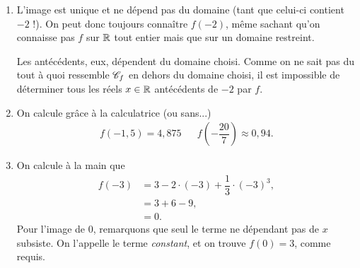 {\begin{enumerate}
			\item L'image est unique et ne dépend pas du domaine (tant que celui-ci contient $-2$ !).
			On peut donc toujours connaître $f(-2)$, même sachant qu'on connaisse pas $f$ sur $\mathbb{R}$ tout entier mais que sur un domaine restreint.
			
			Les antécédents, eux, dépendent du domaine choisi.
			Comme on ne sait pas du tout à quoi ressemble $\mathcal{C}_f$ en dehors du domaine choisi, il est impossible de déterminer tous les réels $x\in\mathbb{R}$ antécédents de $-2$ par $f$.
			
			\item On calcule grâce à la calculatrice (ou sans...)
				\begin{align*}
					f(-1,5) = 4,875 && f\left(-\dfrac{20}7 \right) \approx 0,94.
				\end{align*}
			\item On calcule à la main que
				\begin{align*}
					f(-3) &= 3 - 2 \cdot (-3) + \dfrac13 \cdot (-3)^3, \\
						&= 3 + 6 - 9, \\
						&= 0.
				\end{align*}
			Pour l'image de $0$, remarquons que seul le terme ne dépendant pas de $x$ subsiste. 
			On l'appelle le terme \emph{constant}, et on trouve $f(0) = 3$, comme requis.
		\end{enumerate}
	}
	
	
